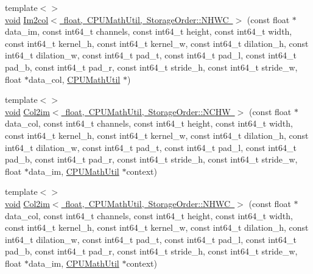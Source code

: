 \begin{DoxyCompactItemize}
{\footnotesize template$<$$>$ }\\\mbox{\hyperlink{mlasi_8h_a88f941d423cb2a819b70a1358982b1a6}{void}} \mbox{\hyperlink{namespaceonnxruntime_1_1math_a5f7576e544a884d7245a591113f0c23f}{Im2col$<$ float, C\+P\+U\+Math\+Util, Storage\+Order\+::\+N\+H\+W\+C $>$}} (const float $\ast$data\+\_\+im, const int64\+\_\+t channels, const int64\+\_\+t height, const int64\+\_\+t width, const int64\+\_\+t kernel\+\_\+h, const int64\+\_\+t kernel\+\_\+w, const int64\+\_\+t dilation\+\_\+h, const int64\+\_\+t dilation\+\_\+w, const int64\+\_\+t pad\+\_\+t, const int64\+\_\+t pad\+\_\+l, const int64\+\_\+t pad\+\_\+b, const int64\+\_\+t pad\+\_\+r, const int64\+\_\+t stride\+\_\+h, const int64\+\_\+t stride\+\_\+w, float $\ast$data\+\_\+col, \mbox{\hyperlink{classonnxruntime_1_1CPUMathUtil}{C\+P\+U\+Math\+Util}} $\ast$)
\item 
{\footnotesize template$<$$>$ }\\\mbox{\hyperlink{mlasi_8h_a88f941d423cb2a819b70a1358982b1a6}{void}} \mbox{\hyperlink{namespaceonnxruntime_1_1math_a81f54d326919afb1852b762199b22e3d}{Col2im$<$ float, C\+P\+U\+Math\+Util, Storage\+Order\+::\+N\+C\+H\+W $>$}} (const float $\ast$data\+\_\+col, const int64\+\_\+t channels, const int64\+\_\+t height, const int64\+\_\+t width, const int64\+\_\+t kernel\+\_\+h, const int64\+\_\+t kernel\+\_\+w, const int64\+\_\+t dilation\+\_\+h, const int64\+\_\+t dilation\+\_\+w, const int64\+\_\+t pad\+\_\+t, const int64\+\_\+t pad\+\_\+l, const int64\+\_\+t pad\+\_\+b, const int64\+\_\+t pad\+\_\+r, const int64\+\_\+t stride\+\_\+h, const int64\+\_\+t stride\+\_\+w, float $\ast$data\+\_\+im, \mbox{\hyperlink{classonnxruntime_1_1CPUMathUtil}{C\+P\+U\+Math\+Util}} $\ast$context)
\item 
{\footnotesize template$<$$>$ }\\\mbox{\hyperlink{mlasi_8h_a88f941d423cb2a819b70a1358982b1a6}{void}} \mbox{\hyperlink{namespaceonnxruntime_1_1math_a56961fa111a24e283dad2df286c006c7}{Col2im$<$ float, C\+P\+U\+Math\+Util, Storage\+Order\+::\+N\+H\+W\+C $>$}} (const float $\ast$data\+\_\+col, const int64\+\_\+t channels, const int64\+\_\+t height, const int64\+\_\+t width, const int64\+\_\+t kernel\+\_\+h, const int64\+\_\+t kernel\+\_\+w, const int64\+\_\+t dilation\+\_\+h, const int64\+\_\+t dilation\+\_\+w, const int64\+\_\+t pad\+\_\+t, const int64\+\_\+t pad\+\_\+l, const int64\+\_\+t pad\+\_\+b, const int64\+\_\+t pad\+\_\+r, const int64\+\_\+t stride\+\_\+h, const int64\+\_\+t stride\+\_\+w, float $\ast$data\+\_\+im, \mbox{\hyperlink{classonnxruntime_1_1CPUMathUtil}{C\+P\+U\+Math\+Util}} $\ast$context)

\end{DoxyCompactItemize}
